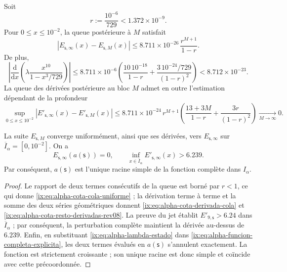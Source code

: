Soit
\[
 r:=\frac{10^{-6}}{729}<1.372\mathbin{\times}10^{-9}.
\]
Pour \(0\leq x\leq10^{-2}\), la queue postérieure à \(M\) satisfait
\begin{equation}
 \left|E_{\mathsf s,\infty}(x)-E_{\mathsf s,M}(x)\right|
 \leq
 8.711\mathbin{\times}10^{-26}\,\frac{r^{M+1}}{1-r}.
 \label{ix:eq:alpha-cota-cola-uniforme}
\end{equation}
De plus,
\begin{equation}
 \left|\frac{\mathrm d}{\mathrm dx}
  \left(\lambda\frac{x^{10}}{1-x^3/729}\right)\right|
 \leq 8.711\mathbin{\times}10^{-6}
 \left(\frac{10\,10^{-18}}{1-r}
 +\frac{3\,10^{-24}/729}{(1-r)^2}\right)
 <8.712\mathbin{\times}10^{-23}.
 \label{ix:eq:alpha-cota-derivada-cola}
\end{equation}
La queue des dérivées postérieure au bloc \(M\) admet en outre l'estimation dépendant de la profondeur
\begin{equation}
 \sup_{0\le x\le10^{-2}}
 \left|E'_{\mathsf s,\infty}(x)-E'_{\mathsf s,M}(x)\right|
 \le 8.711\mathbin{\times}10^{-24}\,r^{M+1}
 \left(\frac{13+3M}{1-r}+\frac{3r}{(1-r)^2}\right)
 \xrightarrow[M\to\infty]{}0.
 \label{ix:eq:alpha-cota-resto-derivadas-rev08}
\end{equation}

\begin{theorem}
\label{ix:thm:alpha-raiz-completa-explicita}
La suite \(E_{\mathsf s,M}\) converge uniformément, ainsi que ses
dérivées, vers \(E_{\mathsf s,\infty}\) sur
\(\overline I_\alpha=[0,10^{-2}]\). On a
\begin{equation}
 E_{\mathsf s,\infty}(a(\mathsf s))=0,
 \qquad
 \inf_{x\in\overline I_\alpha}
 E'_{\mathsf s,\infty}(x)>6.239.
 \label{ix:eq:alpha-raiz-y-derivada-completas}
\end{equation}
Par conséquent, \(a(\mathsf s)\) est l'unique racine simple de la fonction complète dans \(I_\alpha\).
\end{theorem}

\begin{proof}
Le rapport de deux termes consécutifs de la queue est borné par \(r<1\),
ce qui donne \eqref{ix:eq:alpha-cota-cola-uniforme} ; la dérivation terme à
terme et la somme des deux séries géométriques donnent
\eqref{ix:eq:alpha-cota-derivada-cola} et
\eqref{ix:eq:alpha-cota-resto-derivadas-rev08}. La preuve du jet établit
\(E'_{9,\mathsf s}>6.24\) dans \(\overline I_\alpha\) ; par conséquent, la
perturbation complète maintient la dérivée au-dessus de \(6.239\).
Enfin, en substituant \eqref{ix:eq:alpha-lambda-estado} dans
\eqref{ix:eq:alpha-funcion-completa-explicita}, les deux termes évalués en
\(a(\mathsf s)\) s'annulent exactement. La fonction est strictement
croissante ; son unique racine est donc simple et coïncide avec cette précoordonnée.
\end{proof}

